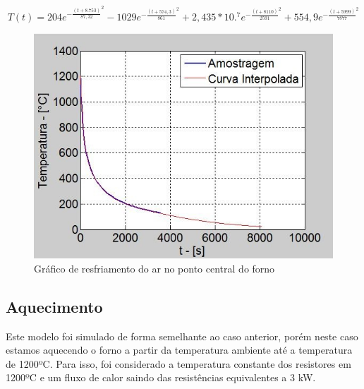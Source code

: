 \begin{equation}
T(t) = 204 e^{-\frac{(t+8.753)}{87,32}^2}
- 1029e^{-\frac{(t+574,3)}{861}^2} + 2,435*10.^7e^{-\frac{(t+8110)}{2591}^2} + 554,9e^{-
\frac{(t+5999)}{7877}^2}
\end{equation}
\begin{figure}[ht]
	\centering
	\label{ansys14}
	\includegraphics[keepaspectratio=true,scale=0.8]{figuras/ansys14.jpg}
    \caption{Gráfico de resfriamento do ar no ponto central do forno}
\end{figure}

\subsection{Aquecimento}
Este modelo foi simulado de forma semelhante ao caso anterior, porém neste caso estamos
aquecendo o forno a partir da temperatura ambiente até a temperatura de 1200ºC. Para isso, foi
considerado a temperatura constante dos resistores em 1200ºC e um fluxo de calor saindo das
resistências equivalentes a 3 kW.

